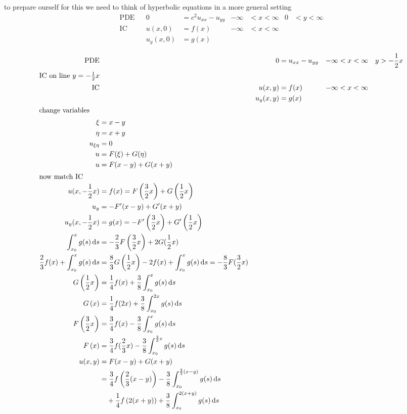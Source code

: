 \documentclass{article}
\begin{document}
to prepare ourself for this we need to think of hyperbolic equations in a more general setting
\begin{align*}
  \text{PDE}&&0&=c^2u_{xx}-u_{yy}&-\infty&<x<\infty&0&<y<\infty\\
  \text{IC}&&u(x,0)&=f(x)&-\infty&<x<\infty\\
  &&u_y(x,0)&=g(x)\\
\end{align*}
\begin{align*}
  \text{PDE}&&0&=u_{xx}-u_{yy}&-\infty&<x<\infty&y>-\frac{1}{2}x\\
  \intertext{IC on line $y=-\frac{1}{2}x$}
  \text{IC}&&u(x,y)&=f(x)&-\infty&<x<\infty\\
  &&u_y(x,y)&=g(x)\\
\intertext{change variables}
  \xi&=x-y\\
  \eta&=x+y\\
  u_{\xi\eta}&=0\\
  u&=F(\xi)+G(\eta)\\
  u&=F(x-y)+G(x+y)\\
  \intertext{now match IC}
  u(x,-\frac{1}{2}x)&=f(x)=F\left(\frac{3}{2}x\right)+G\left(\frac{1}{2}x\right)\\
  u_y&=-F'(x-y)+G'(x+y)\\
  u_y(x,-\frac{1}{2}x)&=g(x)=-F'\left(\frac{3}{2}x\right)+G'\left(\frac{1}{2}x\right)\\
  \int_{x_0}^x{g(s)\,\mathrm{d}s}&=-\frac{2}{3}F\left(\frac{3}{2}x\right)+2G(\frac{1}{2}x)\\
  \frac{2}{3}f(x)+\int_{x_0}^x{g(s)\,\mathrm{d}s}&=\frac{8}{3}G\left(\frac{1}{2}x\right)-2f(x)+\int_{x_0}^x{g(s)\,\mathrm{d}s}=-\frac{8}{3}F(\frac{3}{2}x)\\
  G\left(\frac{1}{2}x\right)&=\frac{1}{4}f(x)+\frac{3}{8}\int_{x_0}^x{g(s)\,\mathrm{d}s}\\
  G\left(x\right)&=\frac{1}{4}f(2x)+\frac{3}{8}\int_{x_0}^{2x}{g(s)\,\mathrm{d}s}\\
  F\left(\frac{3}{2}x\right)&=\frac{3}{4}f(x)-\frac{3}{8}\int_{x_0}^x{g(s)\,\mathrm{d}s}\\
  F\left(x\right)&=\frac{3}{4}f(\frac{2}{3}x)-\frac{3}{8}\int_{x_0}^{\frac{2}{3}x}{g(s)\,\mathrm{d}s}\\
  u(x,y)&=F(x-y)+G(x+y)\\
  &=\frac{3}{4}f\left(\frac{2}{3}(x-y)\right)-\frac{3}{8}\int_{x_0}^{\frac{2}{3}(x-y)}{g(s)\,\mathrm{d}s}\\
  &\quad+\frac{1}{4}f\left(2(x+y)\right)+\frac{3}{8}\int_{x_0}^{2(x+y)}{g(s)\,\mathrm{d}s}\\

\end{align*}
\end{document}

